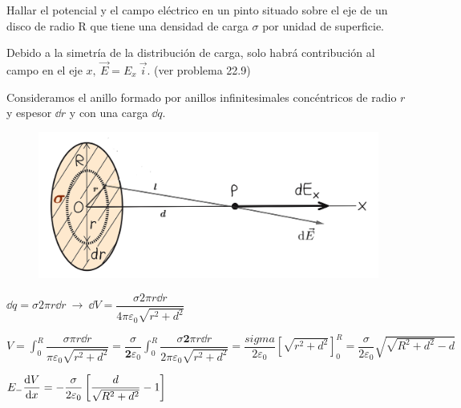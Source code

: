 \begin{prob}
Hallar el potencial y el campo eléctrico en un pinto situado sobre el eje de un disco de radio R que tiene una densidad de carga $\sigma$ por unidad de superficie.	
\end{prob}

Debido a la simetría de la distribución de carga, solo habrá contribución al campo en el eje $x,\ \vec E=E_x\ \vec i$. (ver problema 22.9)

Consideramos el anillo formado por anillos infinitesimales concéntricos de radio $r$ y espesor $\dd r$ y con una carga $\dd q$.

\begin{figure}[H]
	\centering
	\includegraphics[width=.9\textwidth]{imagenes/imagenes22/T22IM26.png}
\end{figure}

$\dd q=\sigma 2 \pi r \dd r \ \to \ \dd V= \dfrac{\sigma 2 \pi r \dd r}{4\pi \varepsilon_0 \sqrt{r^2+d^2}}$

$\displaystyle V=\int_0^R \dfrac{\sigma  \pi r \dd r}{\pi \varepsilon_0 \sqrt{r^2+d^2}}=\dfrac {\sigma}{\boldsymbol{ 2}\varepsilon_0} \int_0^R \dfrac{\sigma \boldsymbol{ 2} \pi r \dd r}{2\pi \varepsilon_0 \sqrt{r^2+d^2}}=\dfrac{sigma}{2\varepsilon_0} \left[ \sqrt{r^2+d^2} \right]_0^R=\dfrac{\sigma}{2\varepsilon_0} \sqrt{\sqrt{R^2+d^2}-d}$

$E_-\displaystyle \dv{V}{x}=-\dfrac{\sigma}{2\varepsilon_0} \left[ \dfrac {d}{\sqrt{R^2+d^2}} -1 \right]$

\newpage %

